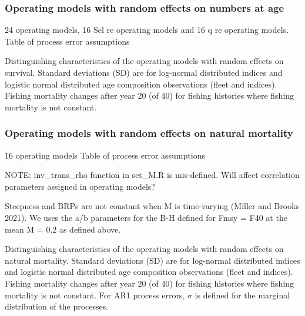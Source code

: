 \documentclass[
  12pt,
]{article}
\begin{document}
\hypertarget{operating-models-with-random-effects-on-numbers-at-age}{%
\subsubsection{Operating models with random effects on numbers at
age}\label{operating-models-with-random-effects-on-numbers-at-age}}

24 operating models, 16 Sel re operating models and 16 q re operating
models. Table of process error assumptions

\begin{landscape}
\begin{table}
\caption{Distinguishing characteristics of the operating models with random effects on survival. Standard deviations (SD) are for log-normal distributed indices and logistic normal distributed age composition observations (fleet and indices). Fishing mortality changes after year 20 (of 40) for fishing histories where fishing mortality is not constant.}
{\footnotesize }
\end{table}
\end{landscape}

\hypertarget{operating-models-with-random-effects-on-natural-mortality}{%
\subsubsection{Operating models with random effects on natural
mortality}\label{operating-models-with-random-effects-on-natural-mortality}}

16 operating models Table of process error assumptions

NOTE: inv\_trans\_rho function in set\_M.R is mis-defined. Will affect
correlation parameters assigned in operating models?

Steepness and BRPs are not constant when M is time-varying (Miller and
Brooks 2021). We uses the a/b parameters for the B-H defined for Fmsy =
F40 at the mean M = 0.2 as defined above.

\begin{landscape}
\begin{table}
\caption{Distinguishing characteristics of the operating models with random effects on natural mortality. Standard deviations (SD) are for log-normal distributed indices and logistic normal distributed age composition observations (fleet and indices). Fishing mortality changes after year 20 (of 40) for fishing histories where fishing mortality is not constant. For AR1 process errors, $\sigma$ is defined for the marginal distribution of the processes.}
{}
\end{table}
\end{landscape}
\end{document}
